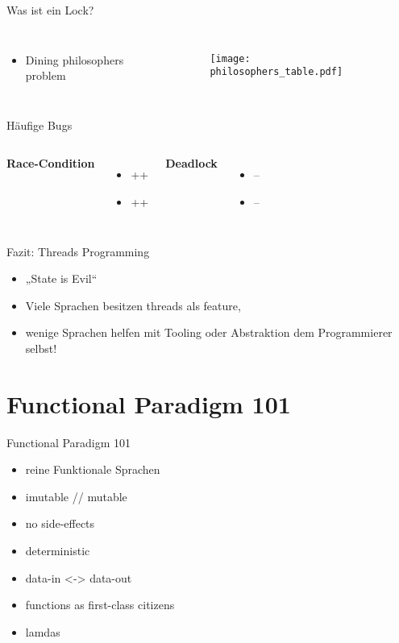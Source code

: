 \documentclass[compress]{beamer}
\begin{document}
  \begin{frame}{Was ist ein Lock?}
    \begin{columns}[c]
      \begin{itemize}
      \item{Dining philosophers problem}
      \end{itemize}
      \begin{figure}
        \centering
        \texttt{[image: philosophers\_table.pdf]}
      \end{figure}
    \end{columns}
  \end{frame}

  \begin{frame}{Häufige Bugs}
    \begin{columns}[c]
      \textbf{Race-Condition}
      \begin{itemize}
        \item ++
        \item ++
      \end{itemize}
      \textbf{Deadlock}
      \begin{itemize}
        \item --
        \item --
      \end{itemize}
    \end{columns}
  \end{frame}
  
  \begin{frame}{Fazit: Threads Programming}
    \begin{itemize}
      \item „State is Evil“
      \item Viele Sprachen besitzen threads als feature,
      \item wenige Sprachen helfen mit Tooling oder Abstraktion dem Programmierer selbst!
    \end{itemize}
  \end{frame}

\section{Functional Paradigm 101}
  \begin{frame}{Functional Paradigm 101}
    \begin{itemize}
      \item reine Funktionale Sprachen
      \item imutable // mutable
      \item no side-effects
      \item deterministic
      \item data-in <-> data-out
      \item functions as first-class citizens
      \item lamdas
    \end{itemize}
  \end{frame}
\end{document}

